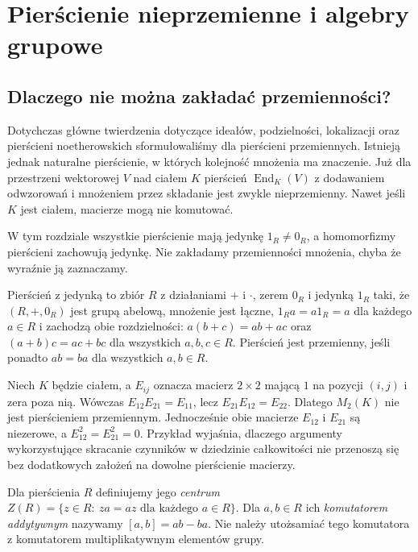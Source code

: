 \chapter{Pierścienie nieprzemienne i algebry grupowe}
\label{aa:ch:noncommutative-rings}

\section{Dlaczego nie można zakładać przemienności?}
Dotychczas główne twierdzenia dotyczące ideałów, podzielności,
lokalizacji oraz pierścieni noetherowskich sformułowaliśmy dla
pierścieni przemiennych. Istnieją jednak naturalne pierścienie, w których
kolejność mnożenia ma znaczenie. Już dla przestrzeni wektorowej
$V$ nad ciałem $K$ pierścień $\operatorname{End}_K(V)$ z dodawaniem
odwzorowań i mnożeniem przez składanie jest zwykle nieprzemienny.
Nawet jeśli $K$ jest ciałem, macierze mogą nie komutować.

W tym rozdziale wszystkie pierścienie mają jedynkę $1_R\ne0_R$,
a homomorfizmy pierścieni zachowują jedynkę. Nie zakładamy
przemienności mnożenia, chyba że wyraźnie ją zaznaczamy.

\begin{definicja}
\label{aa:def:nc-ring}
Pierścień z jedynką to zbiór $R$ z działaniami $+$ i $\cdot$,
zerem $0_R$ i jedynką $1_R$ taki, że $(R,+,0_R)$ jest grupą
abelową, mnożenie jest łączne, $1_Ra=a1_R=a$ dla każdego
$a\in R$ i zachodzą obie rozdzielności:
$ a(b+c)=ab+ac$ oraz $(a+b)c=ac+bc$ dla wszystkich
$a,b,c\in R$. Pierścień jest przemienny, jeśli ponadto
$ab=ba$ dla wszystkich $a,b\in R$.
\end{definicja}

\begin{przyklad}
\label{aa:prz:nc-matrix}
Niech $K$ będzie ciałem, a $E_{ij}$ oznacza macierz $2\times2$
mającą $1$ na pozycji $(i,j)$ i zera poza nią. Wówczas
$E_{12}E_{21}=E_{11}$, lecz $E_{21}E_{12}=E_{22}$.
Dlatego $M_2(K)$ nie jest pierścieniem przemiennym.
Jednocześnie obie macierze $E_{12}$ i $E_{21}$ są niezerowe,
a $E_{12}^2=E_{21}^2=0$. Przykład wyjaśnia, dlaczego
argumenty wykorzystujące skracanie czynników w dziedzinie
całkowitości nie przenoszą się bez dodatkowych założeń
na dowolne pierścienie macierzy.
\end{przyklad}

\begin{definicja}
\label{aa:def:nc-center}
Dla pierścienia $R$ definiujemy jego \emph{centrum}
$Z(R)=\{z\in R:\ za=az\text{ dla każdego }a\in R\}$.
Dla $a,b\in R$ ich \emph{komutatorem addytywnym}
nazywamy $[a,b]=ab-ba$. Nie należy utożsamiać tego
komutatora z komutatorem multiplikatywnym elementów grupy.
\end{definicja}

